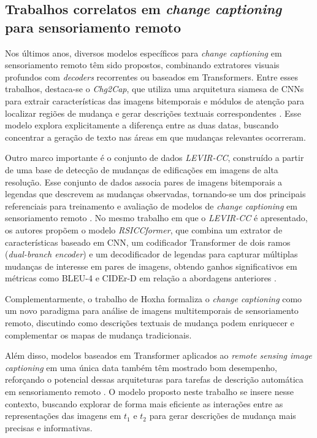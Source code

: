 \subsection{Trabalhos correlatos em \textit{change captioning} para sensoriamento remoto}

Nos últimos anos, diversos modelos específicos para \textit{change captioning} em sensoriamento remoto têm sido propostos, combinando extratores visuais profundos com \textit{decoders} recorrentes ou baseados em Transformers. Entre esses trabalhos, destaca-se o \textit{Chg2Cap}, que utiliza uma arquitetura siamesa de CNNs para extrair características das imagens bitemporais e módulos de atenção para localizar regiões de mudança e gerar descrições textuais correspondentes \cite{chang2023}. Esse modelo explora explicitamente a diferença entre as duas datas, buscando concentrar a geração de texto nas áreas em que mudanças relevantes ocorreram.

Outro marco importante é o conjunto de dados \textit{LEVIR-CC}, construído a partir de uma base de detecção de mudanças de edificações em imagens de alta resolução. Esse conjunto de dados associa pares de imagens bitemporais a legendas que descrevem as mudanças observadas, tornando-se um dos principais referenciais para treinamento e avaliação de modelos de \textit{change captioning} em sensoriamento remoto \cite{liu2022}. No mesmo trabalho em que o \textit{LEVIR-CC} é apresentado, os autores propõem o modelo \textit{RSICCformer}, que combina um extrator de características baseado em CNN, um codificador Transformer de dois ramos (\textit{dual-branch encoder}) e um decodificador de legendas para capturar múltiplas mudanças de interesse em pares de imagens, obtendo ganhos significativos em métricas como BLEU-4 e CIDEr-D em relação a abordagens anteriores \cite{liu2022}.

Complementarmente, o trabalho de Hoxha \cite{hoxha2022} formaliza o \textit{change captioning} como um novo paradigma para análise de imagens multitemporais de sensoriamento remoto, discutindo como descrições textuais de mudança podem enriquecer e complementar os mapas de mudança tradicionais.

Além disso, modelos baseados em Transformer aplicados ao \textit{remote sensing image captioning} em uma única data também têm mostrado bom desempenho, reforçando o potencial dessas arquiteturas para tarefas de descrição automática em sensoriamento remoto \cite{nanal2023}. O modelo proposto neste trabalho se insere nesse contexto, buscando explorar de forma mais eficiente as interações entre as representações das imagens em $t_1$ e $t_2$ para gerar descrições de mudança mais precisas e informativas.

